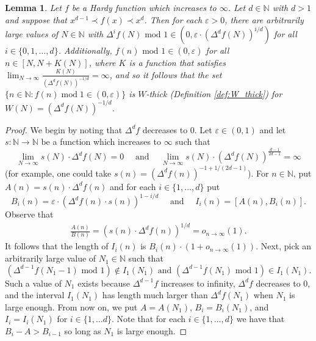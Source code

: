\documentclass[12pt]{article}
\theoremstyle{plain} %
\newtheorem{lemma}[theorem]{Lemma}
\theoremstyle{definition} %
\theoremstyle{plain}
\theoremstyle{plain}
\numberwithin{equation}{section}
\newcommand{\N}{\mathbb{N}}
\renewcommand{\epsilon}{\varepsilon}
\newcommand{\1}{\mathbbm{1}}
\newcommand{\oo}{\infty}
\renewcommand{\mod}{\operatorname{mod}}
\begin{document}
\begin{lemma}\label{lem:derivatives_mod_1}
 Let $f$ be a Hardy function which increases to $\oo$. Let $d\in \N$ with $d>1$ and suppose that $x^{d-1}\prec f(x) \prec x^{d}$. 
 Then for each $\epsilon>0$, there are arbitrarily large values of $N\in \N$ with $\Delta^{i}f(N)\text{ mod } 1\in (0,\epsilon\cdot (\Delta^{d}f(N))^{i/d})$ for all $i\in\{0,1,\dots, d\}$. Additionally, $f(n)\text{ mod } 1\in (0,\epsilon)$ for all $n\in [N,N+K(N)]$, where $K$ is a function that satisfies $\lim_{N\to\oo}\frac{K(N)}{(\Delta^{d} f(N))^{-1/d}}=\oo$, and so it follows that the set $\{n\in \N: f(n)\mod 1\in (0,\epsilon)\}$ is $W$-thick (Definition \ref{def:W_thick}) for $W(N) = (\Delta^{d} f(N))^{-1/d}$.
\end{lemma}
\begin{proof}

We begin by noting that $\Delta^df$ decreases to $0$. Let $\epsilon\in (0,1)$ and let $s:\N\rightarrow \N$ be a function which increases to $\oo$ such that
\begin{equation}\label{eq:s_growth}
\lim_{N\to\oo}s(N)\cdot \Delta^df(N)=0\quad \text{ and }\quad \lim_{N\to\oo}s(N)\cdot (\Delta^df(N))^{\frac{d-1}{2d-1}}=\oo
\end{equation}
(for example, one could take $s(n) = (\Delta^d f(n))^{-1+1/(2d-1)}$).
For $n\in \N$, put $A(n) =s(n)\cdot \Delta^df(n)$ and for each $i\in \{1,\dots, d\}$ put 
\begin{equation}
   B_{i}(n) = \epsilon\cdot \left({\Delta^{d}f(n)}\cdot s(n)\right)^{1-i/d}\quad \text{ and }\quad I_i(n) = \left[A(n),B_i(n)\right].
\end{equation}
Observe that 
\begin{align*}
    \frac{A(n)}{B(n)} = (s(n)\cdot \Delta^df(n))^{1/d}=o_{n\to\oo}(1).
\end{align*}
It follows that the length of $I_i(n)$ is $B_i(n)\cdot (1+o_{n\to\oo}(1)) $. Next, pick an arbitrarily large value of $N_1\in \N$ such that
\[
(\Delta^{d-1}f(N_1-1) \text{ mod } 1) \not\in I_{1}(N_1)\text{ and }(\Delta^{d-1}f(N_1) \text{ mod } 1) \in I_{1}(N_1).
\]
Such a value of $N_1$ exists because $\Delta^{d-1}f$ increases to infinity, $\Delta^{d}f$ decreases to $0$, and the interval $I_{1}(N_1)$ has length much larger than $\Delta^{d}f(N_1)$ when $N_1$ is large enough. From now on, we put $A = A(N_1)$, $B_i = B_i(N_1)$, and $I_i = I_i(N_1)$ for $i\in \{1,\dots d\}$. Note that for each $i\in \{1,\dots, d\}$ we have that $B_i-A>B_{i-1}$ so long as $N_1$ is large enough.  



\end{proof}
\end{document}
